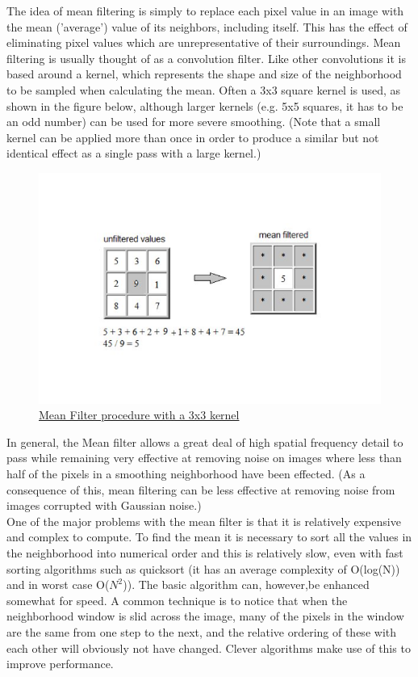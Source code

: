 The idea of mean filtering is simply to replace each pixel value in an image with the mean ('average') value of its neighbors, including itself. This has the effect of eliminating pixel values which are unrepresentative of their surroundings. Mean filtering is usually thought of as a convolution filter. Like other convolutions it is based around a kernel, which represents the shape and size of the neighborhood to be sampled when calculating the mean. Often a 3x3 square kernel is used, as shown in the figure below, although larger kernels (e.g. 5x5 squares, it has to be an odd number) can be used for more severe smoothing. (Note that a small kernel can be applied more than once in order to produce a similar but not identical effect as a single pass with a large kernel.)


\begin{figure}[h]
	\centering
	\includegraphics[width=1\textwidth]{figures/Implementation/meanFilter.png}
	\captionsetup{labelformat=empty}
	\caption{\href{https://www.researchgate.net/publication/348548607_The_Challenge_of_Predicting_OAG_Progression_from_the_Initial_Visual_Field_Test/figures?lo=1}
	{Mean Filter procedure with a 3x3 kernel}}
\end{figure}

In general, the Mean filter allows a great deal of high spatial frequency detail to pass while remaining very effective at removing noise on images where less than half of the pixels in a smoothing neighborhood have been effected. (As a consequence of this, mean filtering can be less effective at removing noise from images corrupted with Gaussian noise.)\\

One of the major problems with the mean filter is that it is relatively expensive and complex to compute. To find the mean it is necessary to sort all the values in the neighborhood into numerical order and this is relatively slow, even with fast sorting algorithms such as quicksort (it has an average complexity of O(log(N)) and in worst case O($N^2$)). The basic algorithm can, however,be enhanced somewhat for speed. A common technique is to notice that when the neighborhood window is slid across the image, many of the pixels in the window are the same from one step to the next, and the relative ordering of these with each other will obviously not have changed. Clever algorithms make use of this to improve performance.\\

